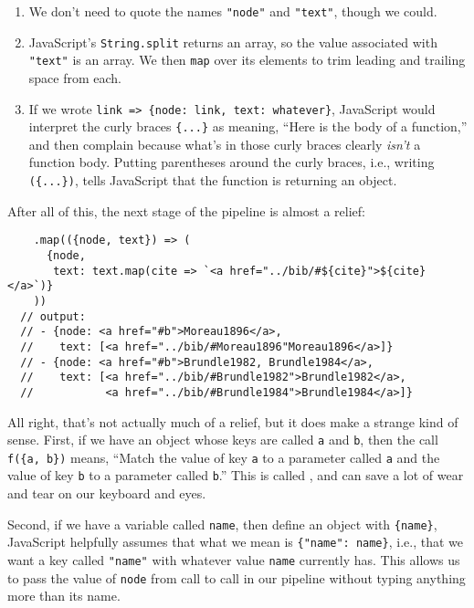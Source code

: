 \begin{enumerate}
\item
  We don't need to quote the names \texttt{"node"} and \texttt{"text"}, though we could.
\item
  JavaScript's \texttt{String.split} returns an array,
  so the value associated with \texttt{"text"} is an array.
  We then \texttt{map} over its elements to trim leading and trailing space from each.
\item
  If we wrote \texttt{link\ ={\textgreater}\ \{node:\ link,\ text:\ whatever\}},
  JavaScript would interpret the curly braces \texttt{\{...\}} as meaning,
  ``Here is the body of a function,''
  and then complain because what's in those curly braces clearly \emph{isn't} a function body.
  Putting parentheses around the curly braces,
  i.e., writing \texttt{(\{...\})},
  tells JavaScript that the function is returning an object.
\end{enumerate}

After all of this,
the next stage of the pipeline is almost a relief:

\begin{verbatim}
    .map(({node, text}) => (
      {node,
       text: text.map(cite => `<a href="../bib/#${cite}">${cite}</a>`)}
    ))
  // output:
  // - {node: <a href="#b">Moreau1896</a>,
  //    text: [<a href="../bib/#Moreau1896"Moreau1896</a>]}
  // - {node: <a href="#b">Brundle1982, Brundle1984</a>,
  //    text: [<a href="../bib/#Brundle1982">Brundle1982</a>,
  //           <a href="../bib/#Brundle1984">Brundle1984</a>]}
\end{verbatim}

All right,
that's not actually much of a relief,
but it does make a strange kind of sense.
First,
if we have an object whose keys are called \texttt{a} and \texttt{b},
then the call \texttt{f(\{a,\ b\})} means,
``Match the value of key \texttt{a} to a parameter called \texttt{a}
and the value of key \texttt{b} to a parameter called \texttt{b}.''
This is called ,
and can save a lot of wear and tear on our keyboard and eyes.

Second,
if we have a variable called \texttt{name},
then define an object with \texttt{\{name\}},
JavaScript helpfully assumes that what we mean is \texttt{\{"name":\ name\}},
i.e.,
that we want a key called \texttt{"name"}
with whatever value \texttt{name} currently has.
This allows us to pass the value of \texttt{node} from call to call in our pipeline
without typing anything more than its name.

